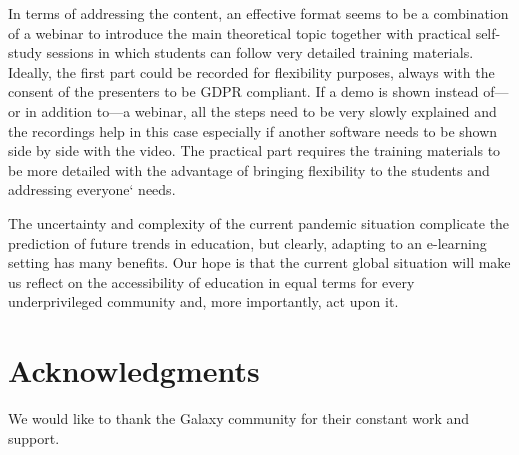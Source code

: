 In terms of addressing the content, an effective format seems to be a combination of a webinar to introduce the main theoretical topic together with practical self-study sessions in which students can follow very detailed training materials. Ideally, the first part could be recorded for flexibility purposes, always with the consent of the presenters to be GDPR compliant. If a demo is shown instead of—or in addition to—a webinar, all the steps need to be very slowly explained and the recordings help in this case especially if another software needs to be shown side by side with the video. The practical part requires the training materials to be more detailed with the advantage of bringing flexibility to the students and addressing everyone` needs.

The uncertainty and complexity of the current pandemic situation complicate the prediction of future trends in education, but clearly, adapting to an e-learning setting has many benefits. Our hope is that the current global situation will make us reflect on the accessibility of education in equal terms for every underprivileged community and, more importantly, act upon it.

\section*{Acknowledgments}

We would like to thank the Galaxy community for their constant work and support.

\footnotesize


\normalsize
